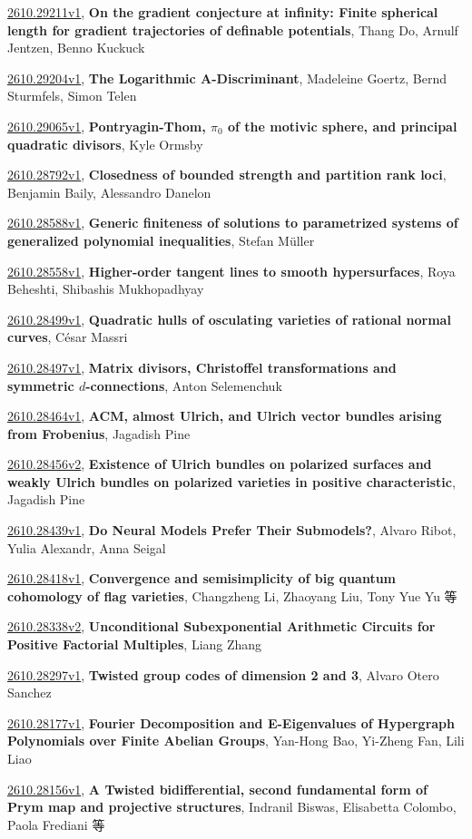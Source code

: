 \documentclass[9pt, a4paper]{article}
\theoremstyle{plain}
\theoremstyle{definition}
\theoremstyle{remark}
\newcommand{\arxiv}[3]{\href{https://arxiv.org/abs/#1}{#1}, \textbf{\textcolor{arxivblue}{#2}}, #3}
\begin{document}
\arxiv{2610.29211v1}{On the gradient conjecture at infinity: Finite spherical length for gradient trajectories of definable potentials}{Thang Do, Arnulf Jentzen, Benno Kuckuck}

\arxiv{2610.29204v1}{The Logarithmic A-Discriminant}{Madeleine Goertz, Bernd Sturmfels, Simon Telen}

\arxiv{2610.29065v1}{Pontryagin-Thom, $π_0$ of the motivic sphere, and principal quadratic divisors}{Kyle Ormsby}

\arxiv{2610.28792v1}{Closedness of bounded strength and partition rank loci}{Benjamin Baily, Alessandro Danelon}

\arxiv{2610.28588v1}{Generic finiteness of solutions to parametrized systems of generalized polynomial inequalities}{Stefan Müller}

\arxiv{2610.28558v1}{Higher-order tangent lines to smooth hypersurfaces}{Roya Beheshti, Shibashis Mukhopadhyay}

\arxiv{2610.28499v1}{Quadratic hulls of osculating varieties of rational normal curves}{César Massri}

\arxiv{2610.28497v1}{Matrix divisors, Christoffel transformations and symmetric $d$-connections}{Anton Selemenchuk}

\arxiv{2610.28464v1}{ACM, almost Ulrich, and Ulrich vector bundles arising from Frobenius}{Jagadish Pine}

\arxiv{2610.28456v2}{Existence of Ulrich bundles on polarized surfaces and weakly Ulrich bundles on polarized varieties in positive characteristic}{Jagadish Pine}

\arxiv{2610.28439v1}{Do Neural Models Prefer Their Submodels?}{Alvaro Ribot, Yulia Alexandr, Anna Seigal}

\arxiv{2610.28418v1}{Convergence and semisimplicity of big quantum cohomology of flag varieties}{Changzheng Li, Zhaoyang Liu, Tony Yue Yu 等}

\arxiv{2610.28338v2}{Unconditional Subexponential Arithmetic Circuits for Positive Factorial Multiples}{Liang Zhang}

\arxiv{2610.28297v1}{Twisted group codes of dimension 2 and 3}{Alvaro Otero Sanchez}

\arxiv{2610.28177v1}{Fourier Decomposition and E-Eigenvalues of Hypergraph Polynomials over Finite Abelian Groups}{Yan-Hong Bao, Yi-Zheng Fan, Lili Liao}

\arxiv{2610.28156v1}{A Twisted bidifferential, second fundamental form of Prym map and projective structures}{Indranil Biswas, Elisabetta Colombo, Paola Frediani 等}
\end{document}
